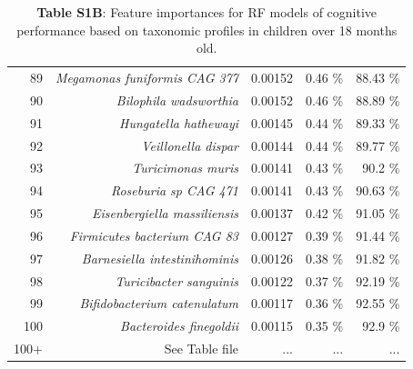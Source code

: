 \documentclass{article}
\begin{document}
\begin{table}[h]
\begin{centering}
\begin{tabular}{|r|r|r|r|r|}
      89 & \textit{Megamonas funiformis CAG 377} & 0.00152 & 0.46 \% & 88.43 \% \\
      90 & \textit{Bilophila wadsworthia} & 0.00152 & 0.46 \% & 88.89 \% \\
      91 & \textit{Hungatella hathewayi} & 0.00145 & 0.44 \% & 89.33 \% \\
      92 & \textit{Veillonella dispar} & 0.00144 & 0.44 \% & 89.77 \% \\
      93 & \textit{Turicimonas muris} & 0.00141 & 0.43 \% & 90.2 \% \\
      94 & \textit{Roseburia sp CAG 471} & 0.00141 & 0.43 \% & 90.63 \% \\
      95 & \textit{Eisenbergiella massiliensis} & 0.00137 & 0.42 \% & 91.05 \% \\
      96 & \textit{Firmicutes bacterium CAG 83} & 0.00127 & 0.39 \% & 91.44 \% \\
      97 & \textit{Barnesiella intestinihominis} & 0.00126 & 0.38 \% & 91.82 \% \\
      98 & \textit{Turicibacter sanguinis} & 0.00122 & 0.37 \% & 92.19 \% \\
      99 & \textit{Bifidobacterium catenulatum} & 0.00117 & 0.36 \% & 92.55 \% \\
      100 & \textit{Bacteroides finegoldii} & 0.00115 & 0.35 \% & 92.9 \% \\
      100+ & See Table file & ... & ... & ... \\\hline\hline
    \end{tabular}
    \caption*{
        \textbf{Table S1B}: Feature importances for RF models of cognitive performance
        based on taxonomic profiles in children over 18 months old.
    }
    \end{centering}
  \end{table}
\end{document}
